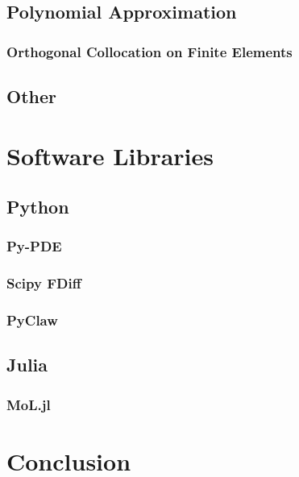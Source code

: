 \documentclass{article}
\begin{document}
\subsection{Polynomial Approximation}
\subsubsection{Orthogonal Collocation on Finite Elements}
\subsection{Other}

\section{Software Libraries}

\subsection{Python}
\subsubsection{Py-PDE}
\subsubsection{Scipy FDiff}
\subsubsection{PyClaw}
\subsection{Julia}
\subsubsection{MoL.jl}





\section{Conclusion}

\newpage{}





\appendix
\end{document}
